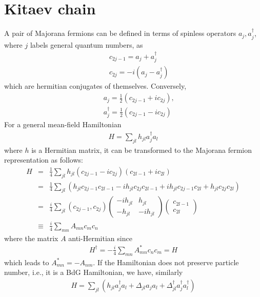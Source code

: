 \section{Kitaev chain}\label{app:majorana-number}
A pair of Majorana fermions can be defined in terms of spinless operators $a_j, a_j^\dag$, where $j$ labels general quantum numbers, as
\begin{eqnarray}\label{eq:atoc}
	&&c_{2j-1} = a_j+ a_j^\dag\\\nonumber
	&&c_{2j} = -i(a_j - a_j^\dag)
\end{eqnarray}
which are hermitian conjugates of themselves. Conversely,
\begin{eqnarray}\label{eq:ctoa}
	&&a_j =\frac{1}{2} (c_{2j-1} + i c_{2j}),\\\nonumber
	&&a_j^\dag = \frac{1}{2}(c_{2j-1} - i c_{2j})
\end{eqnarray}
For a general mean-field Hamiltonian
\begin{eqnarray}
	H = \sum_{jl} h_{jl} a_j^\dag a_l
\end{eqnarray}
where $h$ is a Hermitian matrix, it can be transformed to the Majorana fermion representation as follows:
\begin{eqnarray}\label{eq:BdGMrep}
	H &=& \frac{1}{4}\sum_{jl} h_{jl} (c_{2j-1} - i c_{2j}) ( c_{2l-1} + i c_{2l})\\\nonumber
	&=& \frac{1}{4}\sum_{jl} (h_{jl} c_{2j-1} c_{2l-1} - i h_{jl} c_{2j} c_{2l-1} + ih_{jl} c_{2j-1} c_{2l} + h_{jl} c_{2j} c_{2l}) \\\nonumber
	&=& \frac{i}{4} \sum_{jl} (c_{2j-1}, c_{2j})\begin{pmatrix}
		-ih_{jl} & h_{jl}\\
		-h_{jl} & -ih_{jl}
	\end{pmatrix}\begin{pmatrix}
	c_{2l-1} \\
	c_{2l}
\end{pmatrix}\\\nonumber
&\equiv&\frac{i}{4}\sum_{mn}A_{mn}c_{m}c_n
\end{eqnarray}
where the matrix $A$ anti-Hermitian since
\begin{eqnarray}
	H^\dag = -\frac{i}{4}\sum_{mn}A_{mn}^* c_n c_m =  H
\end{eqnarray}
which leads to $A_{mn}^* = -A_{nm}$. If the Hamiltonian does not preserve particle number, i.e., it is a BdG Hamiltonian, we have, similarly
\begin{eqnarray}
H = \sum_{jl} \left(h_{jl} a_j^\dag a_l + \Delta_{jl} a_j a_l + \Delta^\dag_{jl}  a_j^\dag a_l^\dag\right)
\end{eqnarray}
